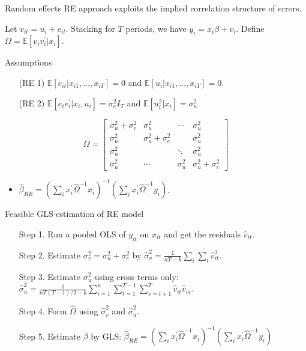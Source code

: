 \begin{frame}{Random effects}
RE approach exploits the implied correlation structure of errors.

Let $v_{it}=u_{i}+e_{it}$. Stacking for $T$ periods, we have $y_{i}=x_{i}\beta+v_{i}$. Define $\Omega=\mathbb{E}[v_{i}v_{i}^{\prime}|x_{i}]$.

\begin{block}{Assumptions}
    \begin{itemize}
\item[](RE 1) $\mathbb{E}[e_{it}|x_{i1},\ldots,x_{iT}]=0$ and $\mathbb{E}[u_{i}|x_{i1},\ldots,x_{iT}]=0$.
\item[](RE 2) $\mathbb{E}[e_{i}e^{\prime}_{i}|x_{i},u_{i}]=\sigma_{e}^{2}I_{T}$ and $\mathbb{E}[u_{i}^{2}|x_{i}]=\sigma_{u}^{2}$
\end{itemize}
\end{block}

$$\Omega=\begin{bmatrix}
    \sigma_{u}^{2}+\sigma_{e}^{2} &\sigma_{u}^{2}  &\cdots &\sigma_{u}^{2}\\
    \sigma_{u}^{2}  &\sigma_{u}^{2}+\sigma_{e}^{2} & &\sigma_{u}^{2}\\
    \sigma_{u}^{2} & & \ddots & \sigma_{u}^{2} \\
    \sigma_{u}^{2} & \cdots & \sigma_{u}^{2} & \sigma_{u}^{2}+\sigma_{e}^{2}
\end{bmatrix}$$
\begin{itemize}
    \item $\hat{\beta}_{RE}=(\sum_{i}x_{i}^{\prime}\hat{\Omega}^{-1}x_{i})^{-1}(\sum_{i}x_{i}^{\prime}\hat{\Omega}^{-1}y_{i})$.
\end{itemize}
\end{frame}

\begin{frame}{Feasible GLS estimation of RE model}
\begin{itemize}
    \item[Step 1.] Run a pooled OLS of $y_{it}$ on $x_{it}$ and get the residuals $\hat{v}_{it}$.
    \item[Step 2.] Estimate $\sigma_{v}^{2}=\sigma_{u}^{2}+\sigma_{e}^{2}$ by $\hat{\sigma}_{v}^{2}=\frac{1}{nT-k}\sum_{i}\sum_{t}\hat{v}_{it}^{2}$.
    \item[Step 3.] Estimate $\sigma_{u}^{2}$ using cross terms only: $\hat{\sigma}_{u}^{2}=\frac{1}{nT(T-1)/2-k}\sum_{i=1}^{n}\sum_{t=1}^{T-1}\sum_{s=t+1}^{T}\hat{v}_{it}\hat{v}_{is}$.
    \item[Step 4.] Form $\hat{\Omega}$ using $\hat{\sigma}_{v}^{2}$ and $\hat{\sigma}_{u}^{2}$.
    \item[Step 5.] Estimate $\beta$ by GLS: $\hat{\beta}_{RE}=(\sum_{i}x_{i}^{\prime}\hat{\Omega}^{-1}x_{i})^{-1}(\sum_{i}x_{i}^{\prime}\hat{\Omega}^{-1}y_{i})$
\end{itemize}
\end{frame}

